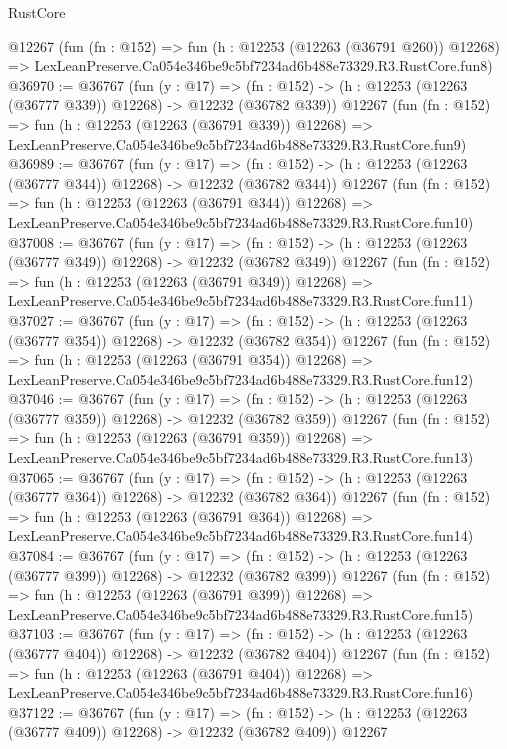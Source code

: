 \begin{lexlean}{RustCore}
\begin{coremodule}
    @12267
    (fun (fn : @152) =>
    fun (h : @12253 (@12263 (@36791 @260)) @12268) =>
    LexLeanPreserve.Ca054e346be9c5bf7234ad6b488e73329.R3.RustCore.fun8)
@36970 := @36767
    (fun (y : @17) =>
    (fn : @152) -> (h : @12253 (@12263 (@36777 @339)) @12268) -> @12232 (@36782 @339))
    @12267
    (fun (fn : @152) =>
    fun (h : @12253 (@12263 (@36791 @339)) @12268) =>
    LexLeanPreserve.Ca054e346be9c5bf7234ad6b488e73329.R3.RustCore.fun9)
@36989 := @36767
    (fun (y : @17) =>
    (fn : @152) -> (h : @12253 (@12263 (@36777 @344)) @12268) -> @12232 (@36782 @344))
    @12267
    (fun (fn : @152) =>
    fun (h : @12253 (@12263 (@36791 @344)) @12268) =>
    LexLeanPreserve.Ca054e346be9c5bf7234ad6b488e73329.R3.RustCore.fun10)
@37008 := @36767
    (fun (y : @17) =>
    (fn : @152) -> (h : @12253 (@12263 (@36777 @349)) @12268) -> @12232 (@36782 @349))
    @12267
    (fun (fn : @152) =>
    fun (h : @12253 (@12263 (@36791 @349)) @12268) =>
    LexLeanPreserve.Ca054e346be9c5bf7234ad6b488e73329.R3.RustCore.fun11)
@37027 := @36767
    (fun (y : @17) =>
    (fn : @152) -> (h : @12253 (@12263 (@36777 @354)) @12268) -> @12232 (@36782 @354))
    @12267
    (fun (fn : @152) =>
    fun (h : @12253 (@12263 (@36791 @354)) @12268) =>
    LexLeanPreserve.Ca054e346be9c5bf7234ad6b488e73329.R3.RustCore.fun12)
@37046 := @36767
    (fun (y : @17) =>
    (fn : @152) -> (h : @12253 (@12263 (@36777 @359)) @12268) -> @12232 (@36782 @359))
    @12267
    (fun (fn : @152) =>
    fun (h : @12253 (@12263 (@36791 @359)) @12268) =>
    LexLeanPreserve.Ca054e346be9c5bf7234ad6b488e73329.R3.RustCore.fun13)
@37065 := @36767
    (fun (y : @17) =>
    (fn : @152) -> (h : @12253 (@12263 (@36777 @364)) @12268) -> @12232 (@36782 @364))
    @12267
    (fun (fn : @152) =>
    fun (h : @12253 (@12263 (@36791 @364)) @12268) =>
    LexLeanPreserve.Ca054e346be9c5bf7234ad6b488e73329.R3.RustCore.fun14)
@37084 := @36767
    (fun (y : @17) =>
    (fn : @152) -> (h : @12253 (@12263 (@36777 @399)) @12268) -> @12232 (@36782 @399))
    @12267
    (fun (fn : @152) =>
    fun (h : @12253 (@12263 (@36791 @399)) @12268) =>
    LexLeanPreserve.Ca054e346be9c5bf7234ad6b488e73329.R3.RustCore.fun15)
@37103 := @36767
    (fun (y : @17) =>
    (fn : @152) -> (h : @12253 (@12263 (@36777 @404)) @12268) -> @12232 (@36782 @404))
    @12267
    (fun (fn : @152) =>
    fun (h : @12253 (@12263 (@36791 @404)) @12268) =>
    LexLeanPreserve.Ca054e346be9c5bf7234ad6b488e73329.R3.RustCore.fun16)
@37122 := @36767
    (fun (y : @17) =>
    (fn : @152) -> (h : @12253 (@12263 (@36777 @409)) @12268) -> @12232 (@36782 @409))
    @12267

\end{coremodule}
\end{lexlean}
